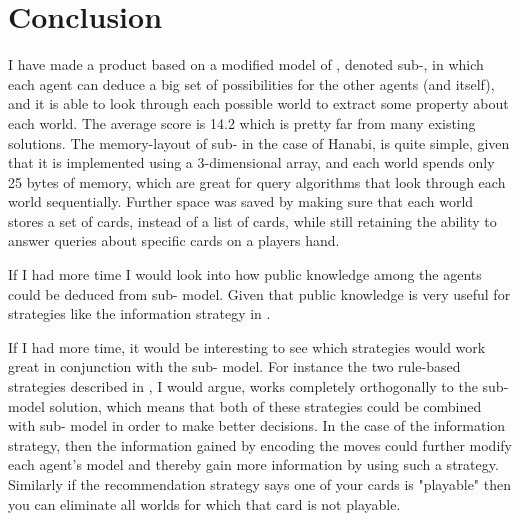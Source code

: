 \section{Conclusion}

I have made a product based on a modified model of \SfiveN{}, denoted sub-\SfiveN{}, in which each agent can deduce a big set of possibilities for the other agents (and itself), and it is able to look through each possible world to extract some property about each world. The average score is 14.2 which is pretty far from many existing solutions. The memory-layout of sub-\SfiveN{} in the case of Hanabi, is quite simple, given that it is implemented using a 3-dimensional array, and each world spends only 25 bytes of memory, which are great for query algorithms that look through each world sequentially.  
Further space was saved by making sure that each world stores a set of cards, instead of a list of cards, while still retaining the ability to answer queries about specific cards on a players hand.

If I had more time I would look into how public knowledge among the agents could be deduced from sub-\SfiveN{} model. Given that public knowledge is very useful for strategies like the information strategy in \cite{CoxEtAl2015}.

If I had more time, it would be interesting to see which strategies would work great in conjunction with the sub-\SfiveN{} model. For instance the two rule-based strategies described in \cite{CoxEtAl2015}, I would argue, works completely orthogonally to the sub-\SfiveN{} model solution, which means that both of these strategies could be combined with sub-\SfiveN{} model in order to make better decisions.
In the case of the information strategy, then the information gained by encoding the moves could further modify each agent's model and thereby gain more information by using such a strategy. 
Similarly if the recommendation strategy says one of your cards is "playable" then you can eliminate all worlds for which that card is not playable.




